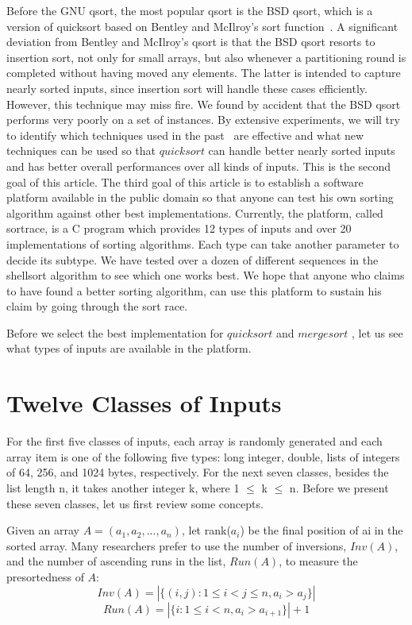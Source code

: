 \documentclass[AMA,STIX1COL]{WileyNJD-v2}
\newcommand{\qusort}{$quicksort$ }
\newcommand{\msort}{$mergesort$ }
\begin{document}
Before the GNU qsort, the most popular qsort is the BSD qsort, which is a version of quicksort based on Bentley and McIlroy’s sort function~\cite{bentley1993engineering}. 
A significant deviation from Bentley and McIlroy’s qsort is that the BSD qsort resorts to insertion sort, not only for small arrays, but also whenever a partitioning round is completed without having moved any elements. 
The latter is intended to capture nearly sorted inputs, since insertion sort will handle these cases efficiently. 
However, this technique may miss fire. We found by accident that the BSD qsort performs very poorly on a set of instances. 
By extensive experiments, we will try to identify which techniques used in the past~\cite{sedgewick1978implementing} are effective and what new techniques can be used so that \qusort can handle better nearly sorted inputs and has better overall performances over all kinds of inputs. 
This is the second goal of this article.
The third goal of this article is to establish a software platform available in the public domain so that anyone can test his own sorting algorithm against other best implementations. 
Currently, the platform, called sortrace, is a C program which provides 12 types of inputs and over 20 implementations of sorting algorithms. 
Each type can take another parameter to decide its subtype. 
We have tested over a dozen of different sequences in the shellsort algorithm to see which one works best. 
We hope that anyone who claims to have found a better sorting algorithm, can use this platform to sustain his claim by going through the sort race.  

Before we select the best implementation for \qusort and \msort, let us see what types of inputs are available in the platform.     

\section{Twelve Classes of Inputs}
For the first five classes of inputs, each array is randomly generated and each array item is one of the following five types: long integer, double, lists of integers of 64, 256, and 1024 bytes, respectively. 
For the next seven classes, besides the list length n, it takes another integer k, where 1 $\leq$ k $\leq$ n.  
Before we present these seven classes, let us first review some concepts.         

Given an array $A = (a_1, a_2, ..., a_n)$, let rank($a_i$) be the final position of ai in the sorted array.
Many researchers prefer to use the number of inversions, $Inv(A)$, and the number of ascending runs in the list, $Run(A)$, to measure the presortedness of $A$:       
\[ Inv(A) = | \{(i, j) : 1 \leq i < j \leq n, a_i > a_j\} | \]            
\[ Run(A) = | \{i : 1 \leq i < n, a_i > a_{i+1}\} | + 1 \]     
\end{document}
